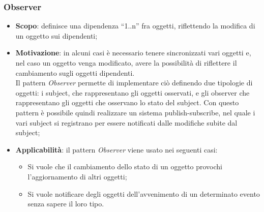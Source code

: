 \subsubsection{Observer}
\begin{itemize}

\item \textbf{Scopo}: definisce una dipendenza “1..n” fra oggetti, riflettendo la modifica di un oggetto sui dipendenti;

\item \textbf{Motivazione}: in alcuni casi è necessario tenere sincronizzati vari oggetti e, nel caso un oggetto venga modificato, avere la possibilità di riflettere il cambiamento sugli oggetti dipendenti. \\ Il pattern \textit{Observer} permette di implementare ciò definendo due tipologie di oggetti: i subject, che rappresentano gli oggetti osservati, e gli observer che rappresentano gli oggetti che osservano lo stato del subject. Con questo pattern è possibile quindi realizzare un sistema publish-subscribe, nel quale i vari subject si registrano per essere notificati dalle modifiche subite dal subject;

\item \textbf{Applicabilità}: il pattern \textit{Observer} viene usato nei seguenti casi:
	\begin{itemize}
		\item Si vuole che il cambiamento dello stato di un oggetto provochi l'aggiornamento di altri oggetti;
		\item Si vuole notificare degli oggetti dell'avvenimento di un determinato evento senza sapere il loro tipo.
	\end{itemize}


\end{itemize}
